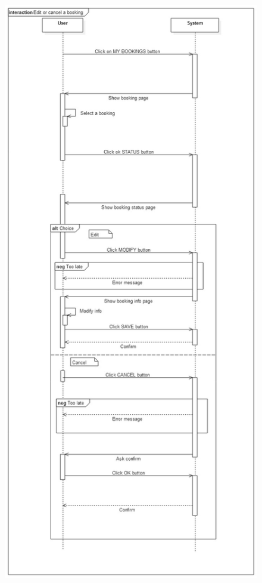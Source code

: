 \begin{figure}[h!]
	\centering
	\includegraphics[height=0.95\textheight]{"myTaxiServiceImg/SequenceDiagram/Edit or cancel a booking"}
\end{figure}


